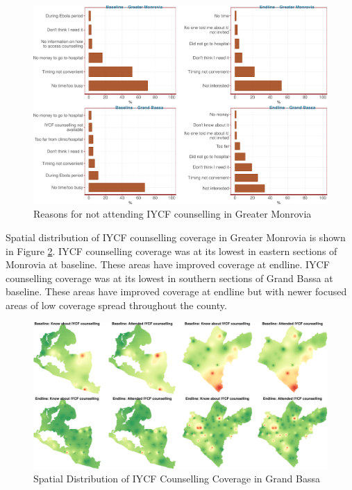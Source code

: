 \documentclass[12pt,a4paper]{article}
\begin{document}
\begin{figure}[H]

{\centering \includegraphics{liberiaCoverageFinalReport_files/figure-latex/icf2table-1} 

}

\caption{Reasons for not attending IYCF counselling in Greater Monrovia}\label{fig:icf2table}
\end{figure}

Spatial distribution of IYCF counselling coverage in Greater Monrovia is shown in Figure \ref{fig:icf1map}. IYCF counselling coverage was at its lowest in eastern sections of Monrovia at baseline. These areas have improved coverage at endline. IYCF counselling coverage was at its lowest in southern sections of Grand Bassa at baseline. These areas have improved coverage at endline but with newer focused areas of low coverage spread throughout the county.

\begin{figure}[H]

{\centering \includegraphics{liberiaCoverageFinalReport_files/figure-latex/icf1map-1} 

}

\caption{Spatial Distribution of IYCF Counselling Coverage in Grand Bassa}\label{fig:icf1map}
\end{figure}
\end{document}
